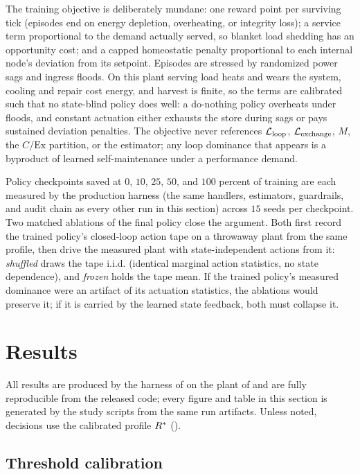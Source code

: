 \documentclass[11pt]{article}
\begin{document}
The training objective is deliberately mundane: one reward point per surviving tick (episodes end on energy depletion, overheating, or integrity loss); a service term proportional to the demand actually served, so blanket load shedding has an opportunity cost; and a capped homeostatic penalty proportional to each internal node's deviation from its setpoint. Episodes are stressed by randomized power sags and ingress floods. On this plant serving load heats and wears the system, cooling and repair cost energy, and harvest is finite, so the terms are calibrated such that no state-blind policy does well: a do-nothing policy overheats under floods, and constant actuation either exhausts the store during sags or pays sustained deviation penalties. The objective never references $\mathcal{L}_{\text{loop}}$, $\mathcal{L}_{\text{exchange}}$, $M$, the $C/\text{Ex}$ partition, or the estimator; any loop dominance that appears is a byproduct of learned self-maintenance under a performance demand.

Policy checkpoints saved at $0$, $10$, $25$, $50$, and $100$ percent of training are each measured by the production harness (the same handlers, estimators, guardrails, and audit chain as every other run in this section) across $15$ seeds per checkpoint. Two matched ablations of the final policy close the argument. Both first record the trained policy's closed-loop action tape on a throwaway plant from the same profile, then drive the measured plant with state-independent actions from it: \emph{shuffled} draws the tape i.i.d. (identical marginal action statistics, no state dependence), and \emph{frozen} holds the tape mean. If the trained policy's measured dominance were an artifact of its actuation statistics, the ablations would preserve it; if it is carried by the learned state feedback, both must collapse it.

\section{Results}
\label{sec:results}

All results are produced by the harness of  on the plant of  and are fully reproducible from the released code; every figure and table in this section is generated by the study scripts from the same run artifacts. Unless noted, decisions use the calibrated profile $R^*$ ().

\subsection{Threshold calibration}
\label{sec:results_calibration}
\end{document}

